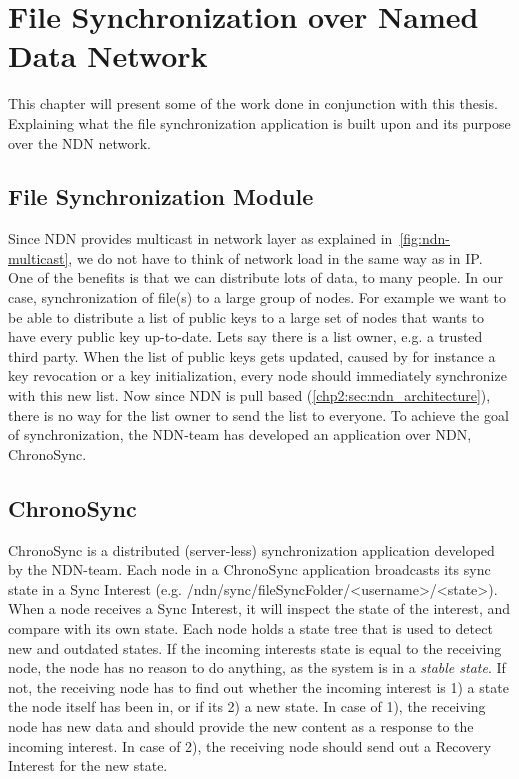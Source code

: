 \chapter{File Synchronization over Named Data Network}\label{chp3:application}
This chapter will present some of the work done in conjunction with this thesis. 
Explaining what the file synchronization application is built upon and its purpose over the \gls{NDN} network. 

\section{File Synchronization Module}\label{file-sync}
Since \gls{NDN} provides multicast in network layer as explained in~\autoref{fig:ndn-multicast}, we do not have to think of network load in the same way as in \gls{IP}.  
One of the benefits is that we can distribute lots of data, to many people. 
In our case, synchronization of file(s) to a large group of nodes. 
For example we want to be able to distribute a list of public keys to a large set of nodes that wants to have every public key up-to-date.
Lets say there is a list owner, e.g. a trusted third party. 
When the list of public keys gets updated, caused by for instance a key revocation or a key initialization, every node should immediately synchronize with this new list.
Now since \gls{NDN} is pull based (\autoref{chp2:sec:ndn_architecture}), there is no way for the list owner to send the list to everyone.
To achieve the goal of synchronization, the \gls{NDN}-team has developed an application over \gls{NDN}, ChronoSync.

\section{ChronoSync}\label{chronosync}
ChronoSync is a distributed (server-less) synchronization application developed by the \gls{NDN}-team. 
Each node in a ChronoSync application broadcasts its sync state in a Sync Interest (e.g. /ndn/sync/fileSyncFolder/<username>/<state>).
When a node receives a Sync Interest, it will inspect the state of the interest, and compare with its own state.
Each node holds a state tree that is used to detect new and outdated states.
If the incoming interests state is equal to the receiving node, the node has no reason to do anything, as the system is in a \textit{stable state}.
If not, the receiving node has to find out whether the incoming interest is 1) a state the node itself has been in, or if its 2) a new state.
In case of 1), the receiving node has new data and should provide the new content as a response to the incoming interest. In case of 2), the receiving node should send out a Recovery Interest for the new state.

